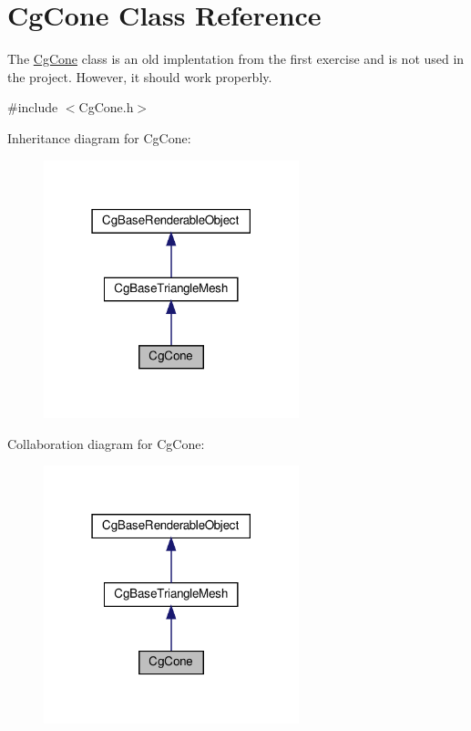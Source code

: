 \hypertarget{class_cg_cone}{}\section{Cg\+Cone Class Reference}
\label{class_cg_cone}


The \hyperlink{class_cg_cone}{Cg\+Cone} class is an old implentation from the first exercise and is not used in the project. However, it should work properbly.  




{\ttfamily \#include $<$Cg\+Cone.\+h$>$}



Inheritance diagram for Cg\+Cone\+:
\nopagebreak
\begin{figure}[H]
\begin{center}
\leavevmode
\includegraphics[width=210pt]{class_cg_cone__inherit__graph}
\end{center}
\end{figure}


Collaboration diagram for Cg\+Cone\+:
\nopagebreak
\begin{figure}[H]
\begin{center}
\leavevmode
\includegraphics[width=210pt]{class_cg_cone__coll__graph}
\end{center}
\end{figure}
